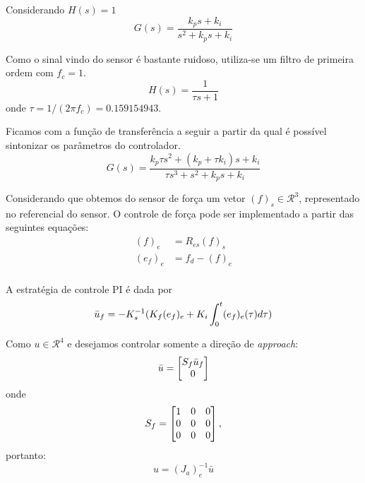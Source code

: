 Considerando $H(s) = 1$
\begin{equation}
G(s) = \frac{k_p s + k_i}{s^2 + k_p s + k_i}
\end{equation}

Como o sinal vindo do sensor é bastante ruidoso, utiliza-se um filtro de primeira ordem com $f_c = 1$.
\begin{equation}
H(s) = \frac{1}{\tau s + 1}
\end{equation}
onde $\tau = 1/(2 \pi f_c) = 0.159154943$.

Ficamos com a função de transferência a seguir a partir da qual é possível sintonizar os parâmetros do controlador.
\begin{equation}
G(s) = \frac{k_p \tau s^2 + (k_p + \tau k_i)s + k_i}{\tau s^3 + s^2 + k_p s + k_i}
\end{equation}

Considerando que obtemos do sensor de força um vetor $({f})_s \in \mathcal{R}^3$, representado no referencial do sensor. O controle de força pode ser implementado a partir das seguintes equações:
\begin{align}
({f})_e &= {R}_{es} ({f})_s \\
({e}_f)_e &= {f}_d - ({f})_e \\
\end{align}

A estratégia de controle PI é dada por
\begin{equation}
\bar{{u}}_f = -{K}_s^{-1} ({K}_f ({e}_f)_e + {K}_i \int_0^t ({e}_f)_e (\tau)d\tau)\\
\end{equation}

Como ${u} \in \mathcal{R}^4$  e desejamos controlar somente a direção de \textit{approach}:
\begin{equation}
\bar{{u}} = \begin{bmatrix} {S}_f \bar{{u}}_f \\ 0\end{bmatrix} 
\end{equation}
onde 
\begin{equation}
{S}_f = \begin{bmatrix}
  1 & 0 & 0 \\
  0 & 0 & 0 \\
  0 & 0 & 0
\end{bmatrix},
\end{equation}
portanto:
\begin{equation}
{u} = ({J_a})_e^{-1} \bar{{u}}
\end{equation}




